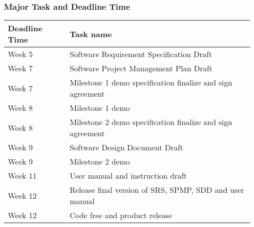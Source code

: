 \documentclass[11pt, a4paper]{article}
\begin{document}
	\subsubsection{Major Task and Deadline Time}
		\begin{tabular}{|p{3cm}|p{8cm}|}
			\hline 
			\textbf{Deadline Time} &\textbf{Task name} \\ 
			\hline 
				Week 5 & Software Requirement Specification Draft\\ 
			\hline 
				Week 7 & Software Project Management Plan Draft\\ 
			\hline 		
				Week 7 & Milestone 1 demo specification finalize and sign agreement\\ 
			\hline 
				Week 8 & Milestone 1 demo\\ 
			\hline 
				Week 8 & Milestone 2 demo specification finalize and sign agreement\\ 
			\hline 
				Week 9 & Software Design Document Draft\\ 
			\hline 
				Week 9 & Milestone 2 demo\\ 
			\hline 		
				Week 11 & User manual and instruction draft\\ 
			\hline 
				Week 12 & Release final version of SRS, SPMP, SDD and user manual\\ 
			\hline 
				Week 12 & Code free and product release\\ 
			\hline 
		\end{tabular} 

	
\end{document}
